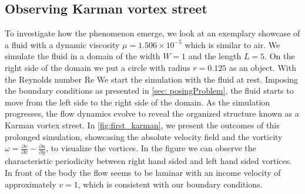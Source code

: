\subsection{Observing Karman vortex street}
To investigate how the phenomenon emerge, we look at an exemplary showcase of a fluid with a dynamic viscosity $\mu = 1.506 \times 10^{-5}$ which is similar to air. We simulate the fluid in a domain of the width $W = 1$ and the length $L = 5$. On the right side of the domain we put a circle with radius $r = 0.125$ as an object. With the Reynolds number Re We start the simulation with the fluid at rest. Imposing the boundary conditions as presented in \cref{sec: posingProblem}, the fluid starts to move from the left side to the right side of the domain.
As the simulation progresses, the flow dynamics evolve to reveal the organized structure known as a Karman vortex street. In \cref{fig:first_karman}, we present the outcomes of this prolonged simulation, showcasing the absolute velocity field and the vorticity $ \omega = \frac{\partial v}{\partial x} - \frac{\partial u}{\partial y}$, to visualize the vortices. In the figure we can observe the characteristic periodicity between right hand sided and left hand sided vortices. In front of the body the flow seems to be laminar with an income velocity of approximately $v = 1$, which is consistent with our boundary conditions.
